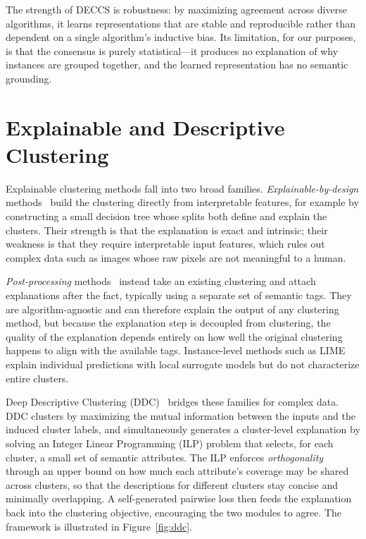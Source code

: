 The strength of DECCS is robustness: by maximizing agreement across diverse algorithms, it learns representations that are stable and reproducible rather than dependent on a single algorithm's inductive bias. Its limitation, for our purposes, is that the consensus is purely statistical---it produces no explanation of why instances are grouped together, and the learned representation has no semantic grounding.

\section{Explainable and Descriptive Clustering}
\label{sec:rw_explainable}

Explainable clustering methods fall into two broad families. \emph{Explainable-by-design} methods~\citep{Bertsimas2020, Moshkovitz2020} build the clustering directly from interpretable features, for example by constructing a small decision tree whose splits both define and explain the clusters. Their strength is that the explanation is exact and intrinsic; their weakness is that they require interpretable input features, which rules out complex data such as images whose raw pixels are not meaningful to a human.

\emph{Post-processing} methods~\citep{davidson2018, Sambaturu2020} instead take an existing clustering and attach explanations after the fact, typically using a separate set of semantic tags. They are algorithm-agnostic and can therefore explain the output of any clustering method, but because the explanation step is decoupled from clustering, the quality of the explanation depends entirely on how well the original clustering happens to align with the available tags. Instance-level methods such as LIME~\citep{Ribeiro2016} explain individual predictions with local surrogate models but do not characterize entire clusters.

Deep Descriptive Clustering (DDC)~\citep{Zhang2021} bridges these families for complex data. DDC clusters by maximizing the mutual information between the inputs and the induced cluster labels, and simultaneously generates a cluster-level explanation by solving an Integer Linear Programming (ILP) problem that selects, for each cluster, a small set of semantic attributes. The ILP enforces \emph{orthogonality} through an upper bound on how much each attribute's coverage may be shared across clusters, so that the descriptions for different clusters stay concise and minimally overlapping. A self-generated pairwise loss then feeds the explanation back into the clustering objective, encouraging the two modules to agree. The framework is illustrated in Figure~\ref{fig:ddc}.

